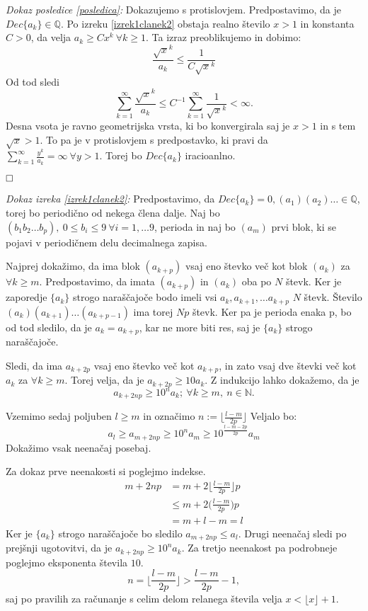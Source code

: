 \documentclass[a4paper,12pt]{article}
\def\N{\mathbb{N}} %
\def\Q{\mathbb{Q}} %
\def\qed{$\hfill\Box$}   %
\begin{document}
\noindent
{\em Dokaz posledice \ref{posledica}:\/}
Dokazujemo s protislovjem. Predpostavimo, da je $Dec\{a_k\} \in \Q$.
Po izreku \ref{izrek1clanek2} obstaja realno število $x > 1$ in konstanta $C>0$, da velja
$a_k \geq Cx^k \ \forall k \geq 1$. Ta izraz preoblikujemo in dobimo:
\[
    \frac{\sqrt{x}^k}{a_k} \leq \frac{1}{C\sqrt{x}^k}\] 
Od tod sledi
\[ \sum_{k=1}^{\infty} \frac{\sqrt{x}^k}{a_k} \leq C^{-1} \sum_{k=1}^{\infty} \frac{1}{\sqrt{x}^k} < \infty.\]
Desna vsota je ravno geometrijska vrsta, ki bo konvergirala saj je $x > 1$ in s tem $\sqrt{x} > 1$.
To pa je v protislovjem s predpostavko, ki pravi da $\sum_{k=1}^{\infty}\frac{y^k}{a_k} = \infty \ \forall y>1$.
Torej bo $Dec\{a_k\}$ iracioanlno.

\qed

{\em Dokaz izreka \ref{izrek1clanek2}:\/} Predpostavimo, da $Dec\{a_k\} = 0,(a_1)(a_2)\dots \in \Q$, torej bo 
periodično od nekega člena dalje. Naj bo
$(b_1b_2 \dots b_p), \ 0 \leq b_i \leq 9 \ \forall i = 1, \dots 9$, perioda in naj bo
$(a_m)$ prvi blok, ki se pojavi v periodičnem delu decimalnega zapisa.

Najprej dokažimo, da ima blok $(a_{k+p})$ vsaj eno števko več kot blok $(a_k)$ za $\forall k \geq m$.
Predpostavimo, da imata $(a_{k+p})$ in $(a_k)$ oba po $N$ števk. 
Ker je zaporedje $\{a_k\}$ strogo naraščajoče bodo imeli vsi $a_k, a_{k+1}, \dots a_{k+p}$ $N$ števk.
Število $(a_k)(a_{k+1})\dots (a_{k+p-1})$ ima torej $Np$ števk. Ker pa je perioda enaka p,
bo od tod sledilo, da je $a_k = a_{k+p}$, kar ne more biti res, saj je $\{a_k\}$ strogo naraščajoče.

Sledi, da ima $a_{k+ 2p}$ vsaj eno števko več kot $a_{k+p}$, in zato vsaj dve števki več kot $a_k$
za $\forall k \geq m$.
Torej velja, da je $a_{k+2p} \geq 10 a_k$. Z indukcijo lahko dokažemo, da je 
\[ a_{k+2np} \geq 10^n a_k; \ \forall k \geq m, \ n \in \N.\]

Vzemimo sedaj poljuben $l \geq m$ in označimo $n := \lfloor \frac{l-m}{2p} \rfloor$
Veljalo bo:
\begin{equation}\label{enacba1}
    a_l \geq a_{m+2np} \geq 10^n a_m \geq 10 ^{\frac{l-m-2p}{2p}}a_m
\end{equation}
Dokažimo vsak neenačaj posebaj.

Za dokaz prve neenakosti si poglejmo indekse. 
\[
    \begin{split}
    m + 2np &= m + 2 \bigg\lfloor \frac{l-m}{2p}\bigg\rfloor p \\
    &\leq m + 2\bigg(\frac{l-m}{2p}\bigg)p \\
    &= m + l - m = l
    \end{split}
    \] 
Ker je $\{a_k\}$ strogo naraščajoče bo sledilo $a_{m+2np} \leq a_l$.
Drugi neenačaj sledi po prejšnji ugotovitvi, da je $a_{k+2np} \geq 10^n a_k$.
Za tretjo neenakost pa podrobneje poglejmo eksponenta števila $10$. 
\[
    n = \bigg\lfloor \frac{l-m}{2p}\bigg\rfloor > \frac{l-m}{2p} - 1,
     \]
saj po pravilih za računanje s celim delom relanega števila velja $x < \lfloor x\rfloor + 1$.
\end{document}
